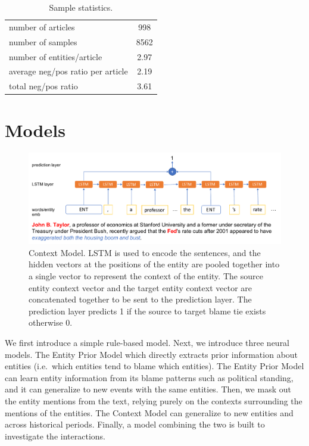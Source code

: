 \documentclass[letterpaper]{article} %
\begin{document}
\begin{table}[t]
\centering
\begin{tabular}{l c}
 \hline
 number of articles & 998 \\
 number of samples & 8562 \\
 number of entities/article & 2.97 \\
 average neg/pos ratio per article & 2.19 \\
 total neg/pos ratio & 3.61 \\
 \hline
\end{tabular}
\caption{Sample statistics.}
\label{table:samplestats}
\end{table}

\section{Models}

\begin{figure}[t!]
  \centering
  \includegraphics[width=\textwidth]{contextmodel.pdf}
  \caption{Context Model. LSTM is used to encode the sentences, and the hidden vectors at the positions of the entity are pooled together into a single vector to represent the context of the entity. The source entity context vector and the target entity context vector are concatenated together to be sent to the prediction layer. The prediction layer predicts 1 if the source to target blame tie exists otherwise 0.}
  \label{figure:contextmodel}
\end{figure}

We first introduce a simple rule-based model. Next, we introduce three neural models. The Entity Prior Model which directly extracts prior information about entities (i.e.\ which entities tend to blame which entities). The Entity Prior Model can learn entity information from its blame patterns such as political standing, and it can generalize to new events with the same entities. Then, we mask out the entity mentions from the text, relying purely on the contexts surrounding the mentions of the entities. The Context Model can generalize to new entities and across historical periods. Finally, a model combining the two is built to investigate the interactions.
\end{document}
